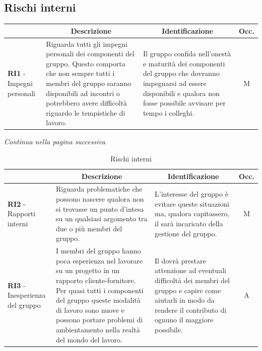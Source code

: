 \subsection{Rischi interni} \label{subsection:rischi_interni}
\begin{table}[H]
  \centering
  \renewcommand{\arraystretch}{1.8}
  \begin{tabular}{p{5.5cm}|p{5cm}|p{5cm}|c}
    \rowcolor[HTML]{125E28} 
    \multicolumn{1}{c}{\color[HTML]{FFFFFF}\textbf{Codice}}
    & \multicolumn{1}{c}{\color[HTML]{FFFFFF}\textbf{Descrizione}}
    & \multicolumn{1}{c}{\color[HTML]{FFFFFF}\textbf{Identificazione}}
    & \color[HTML]{FFFFFF}\textbf{Occ.}\\
    \hline
    \textbf{RI1} - Impegni personali & Riguarda tutti gli impegni personali dei componenti del gruppo. Questo comporta che non sempre tutti i membri del gruppo saranno disponibili ad incontri o potrebbero avere difficoltà riguardo le tempistiche di lavoro. & Il gruppo confida nell'onestà e maturità dei componenti del gruppo che dovranno impegnarsi ad essere disponibili e qualora non fosse possibile avvisare per tempo i colleghi. & M \\
  \end{tabular}
\end{table}
\begin{center}
  \textit{\small Continua nella pagina successiva}
\end{center}
\begin{table}[H]
  \centering
  \renewcommand{\arraystretch}{1.8}
  \begin{tabular}{p{5.5cm}|p{5cm}|p{5cm}|c}
    \rowcolor[HTML]{125E28} 
    \multicolumn{1}{c}{\color[HTML]{FFFFFF}\textbf{Codice}}
    & \multicolumn{1}{c}{\color[HTML]{FFFFFF}\textbf{Descrizione}}
    & \multicolumn{1}{c}{\color[HTML]{FFFFFF}\textbf{Identificazione}}
    & \color[HTML]{FFFFFF}\textbf{Occ.}\\
    \hline
    \textbf{RI2} - Rapporti interni & Riguarda problematiche che possono nascere qualora non si trovasse un punto d'intesa su un qualsiasi argomento tra due o più membri del gruppo. & L'interesse del gruppo è evitare queste situazioni ma, qualora capitassero, il \roleProjectManagerLow{} sarà incaricato della gestione del gruppo. & M \\
    \textbf{RI3} - Inesperienza del gruppo & I membri del gruppo hanno poca esperienza nel lavorare su un progetto in un rapporto cliente-fornitore. Per quasi tutti i componenti del gruppo queste modalità di lavoro sono nuove e possono portare problemi di ambientamento nella realtà del mondo del lavoro. & Il \roleProjectManagerLow{} dovrà prestare attenzione ad eventuali difficoltà dei membri del gruppo e capire come aiutarli in modo da rendere il contributo di ognuno il maggiore possibile. & A \\
  \end{tabular}
  \caption{Rischi interni}
\end{table}

